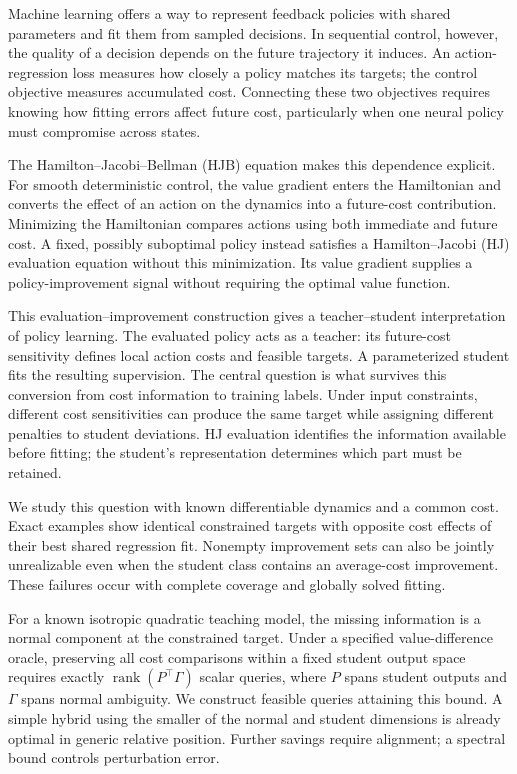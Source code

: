 Machine learning offers a way to represent feedback policies with shared
parameters and fit them from sampled decisions. In sequential control,
however, the quality of a decision depends on the future trajectory it
induces. An action-regression loss measures how closely a policy matches
its targets; the control objective measures accumulated cost. Connecting
these two objectives requires knowing how fitting errors affect future
cost, particularly when one neural policy must compromise across states.

The Hamilton--Jacobi--Bellman (HJB) equation makes this dependence
explicit. For smooth deterministic control, the value gradient enters
the Hamiltonian and converts the effect of an action on the dynamics
into a future-cost contribution. Minimizing the Hamiltonian compares
actions using both immediate and future cost. A fixed, possibly
suboptimal policy instead satisfies a Hamilton--Jacobi (HJ) evaluation
equation without this minimization. Its value gradient supplies a
policy-improvement signal without requiring the optimal value function.

This evaluation--improvement construction gives a teacher--student
interpretation of policy learning. The evaluated policy acts as a teacher:
its future-cost sensitivity defines local action costs and feasible
targets. A parameterized student fits the resulting supervision.
The central question is what survives this conversion from cost
information to training labels. Under input constraints, different cost
sensitivities can produce the same target while assigning different
penalties to student deviations. HJ evaluation identifies the information
available before fitting; the student's representation determines which
part must be retained.

We study this question with known differentiable dynamics and a common
cost. Exact examples show identical constrained targets with opposite
cost effects of their best shared regression fit. Nonempty improvement
sets can also be jointly unrealizable even when the student class
contains an average-cost improvement. These failures occur with complete
coverage and globally solved fitting.

For a known isotropic quadratic teaching model, the missing information
is a normal component at the constrained target. Under a specified
value-difference oracle, preserving all cost comparisons within a fixed
student output space requires exactly
$\operatorname{rank}(P^\top\Gamma)$ scalar queries, where $P$ spans
student outputs and $\Gamma$ spans normal ambiguity. We construct
feasible queries attaining this bound. A simple hybrid
using the smaller of the normal and student dimensions is already
optimal in generic relative position. Further savings require alignment;
a spectral bound controls perturbation error.

